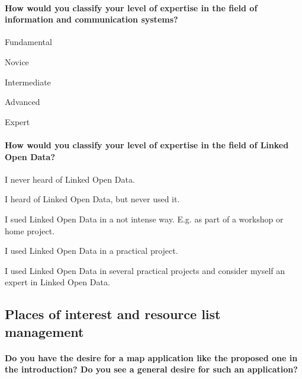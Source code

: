 \documentclass{article}
\begin{document}
\opentwo

\paragraph{How would you classify your level of expertise in the field of information and communication systems?}

\begin{longanswersB}
	\item Fundamental
	\item Novice
	\item Intermediate
	\item Advanced
	\item Expert
\end{longanswersB}

\paragraph{How would you classify your level of expertise in the field of Linked Open Data?}

\begin{longanswersB}
	\item I never heard of Linked Open Data.
	\item I heard of Linked Open Data, but never used it.
	\item I sued Linked Open Data in a not intense way. E.g. as part of a workshop or home project.
	\item I used Linked Open Data in a practical project.
	\item I used Linked Open Data in several practical projects and consider myself an expert in Linked Open Data.
\end{longanswersB}

\subsection{Places of interest and resource list management}
\label{questionaire:places-of-intereset-rlm}

\paragraph{Do you have the desire for a map application like the proposed one in the introduction? Do you see a general desire for such an application?}

\opentwo
\end{document}
